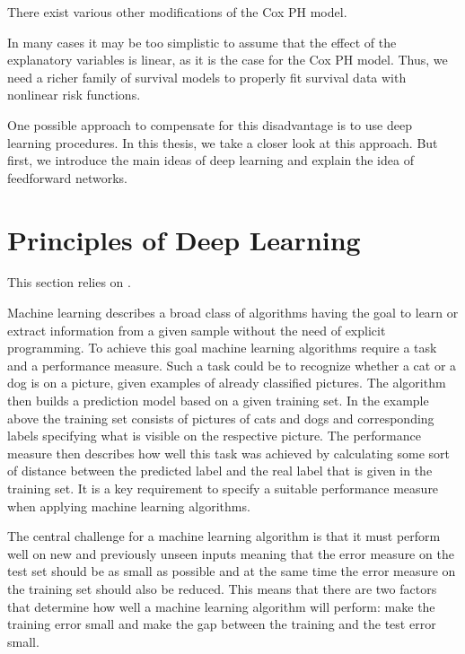 \documentclass[12pt, a4paper]{scrartcl}
\theoremstyle{definition}
\theoremstyle{plain}
\numberwithin{equation}{section}
\numberwithin{figure}{section}
\numberwithin{table}{section}
\begin{document}
	There exist various other modifications of the Cox PH model.
	
	In many cases it may be too simplistic to assume that the effect of the explanatory variables is linear, as it is the case for the Cox PH model.
	Thus, we need a richer family of survival models to properly fit survival data with nonlinear risk functions.
	
	One possible approach to compensate for this disadvantage is to use deep learning procedures.
	In this thesis, we take a closer look at this approach.
	But first, we introduce the main ideas of deep learning and explain the idea of feedforward networks.
	\newpage
	
	\section{Principles of Deep Learning}\label{basicsdl}
	This section relies on \citet*{deeplbook}.
	
	Machine learning describes a broad class of algorithms having the goal to learn or extract information from a given sample without the need of explicit programming.
	To achieve this goal machine learning algorithms require a task and a performance measure.
	Such a task could be to recognize whether a cat or a dog is on a picture, given examples of already classified pictures.
	The algorithm then builds a prediction model based on a given training set.
	In the example above the training set consists of pictures of cats and dogs and corresponding labels specifying what is visible on the respective picture.
	The performance measure then describes how well this task was achieved by calculating some sort of distance between the predicted label and the real label that is given in the training set.
	It is a key requirement to specify a suitable performance measure when applying machine learning algorithms.
	

	The central challenge for a machine learning algorithm is that it must perform well on new and previously unseen inputs meaning that the error measure on the test set should be as small as possible and at the same time the error measure on the training set should also be reduced.
	This means that there are two factors that determine how well a machine learning algorithm will perform:
	make the training error small and make the gap between the training and the test error small.
	
\end{document}
